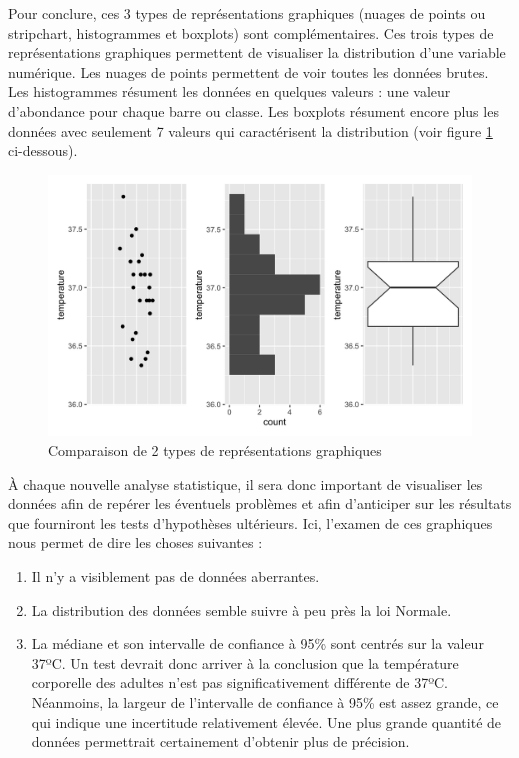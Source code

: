 \documentclass[
  a4paper,
]{article}
\providecommand{\tightlist}{%
  \setlength{\itemsep}{0pt}\setlength{\parskip}{0pt}}
\begin{document}
Pour conclure, ces 3 types de représentations graphiques (nuages de points ou stripchart, histogrammes et boxplots) sont complémentaires. Ces trois types de représentations graphiques permettent de visualiser la distribution d'une variable numérique. Les nuages de points permettent de voir toutes les données brutes. Les histogrammes résument les données en quelques valeurs : une valeur d'abondance pour chaque barre ou classe. Les boxplots résument encore plus les données avec seulement 7 valeurs qui caractérisent la distribution (voir figure \ref{fig:compdistr} ci-dessous).

\begin{figure}[htpb]

{\centering \includegraphics[width=0.9\linewidth]{figure/compdistr-1} 

}

\caption{Comparaison de 2 types de représentations graphiques}\label{fig:compdistr}
\end{figure}

À chaque nouvelle analyse statistique, il sera donc important de visualiser les données afin de repérer les éventuels problèmes et afin d'anticiper sur les résultats que fourniront les tests d'hypothèses ultérieurs. Ici, l'examen de ces graphiques nous permet de dire les choses suivantes :

\begin{enumerate}
\def\labelenumi{\arabic{enumi}.}
\tightlist
\item
  Il n'y a visiblement pas de données aberrantes.
\item
  La distribution des données semble suivre à peu près la loi Normale.
\item
  La médiane et son intervalle de confiance à 95\% sont centrés sur la valeur 37ºC. Un test devrait donc arriver à la conclusion que la température corporelle des adultes n'est pas significativement différente de 37ºC. Néanmoins, la largeur de l'intervalle de confiance à 95\% est assez grande, ce qui indique une incertitude relativement élevée. Une plus grande quantité de données permettrait certainement d'obtenir plus de précision.
\end{enumerate}
\end{document}
